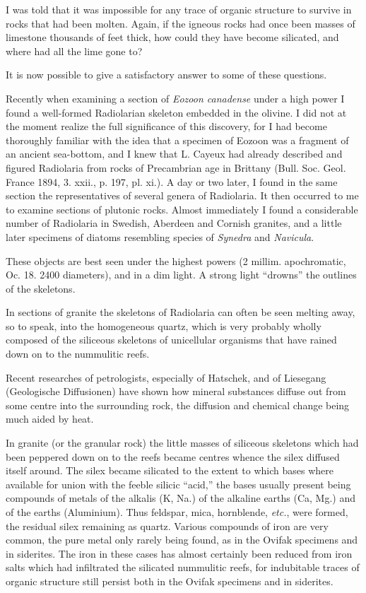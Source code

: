 \documentclass[a4paper, 12pt, oneside]{article}
\begin{document}
I was told that it was impossible for any trace of organic structure to survive in rocks that had been molten. Again, if the igneous rocks had once been masses of limestone thousands of feet thick, how could they have become silicated, and where had all the lime gone to?

It is now possible to give a satisfactory answer to some of these questions.

Recently when examining a section of \emph{Eozoon canadense} under a high power I found a well-formed Radiolarian skeleton embedded in the olivine. I did not at the moment realize the full significance of this discovery, for I had become thoroughly familiar with the idea that a specimen of Eozoon was a fragment of an ancient sea-bottom, and I knew that L. Cayeux had already described and figured Radiolaria from rocks of Precambrian age in Brittany (Bull. Soc. Geol. France 1894, 3. xxii., p. 197, pl. xi.). A day or two later, I found in the same section the representatives of several genera of Radiolaria. It then occurred to me to examine sections of plutonic rocks. Almost immediately I found a considerable number of Radiolaria in Swedish, Aberdeen and Cornish granites, and a little later specimens of diatoms resembling species of \emph{Synedra} and \emph{Navicula}.

These objects are best seen under the highest powers (2 millim. apochromatic, Oc. 18. 2400 diameters), and in a dim light. A strong light ``drowns'' the outlines of the skeletons.

In sections of granite the skeletons of Radiolaria can often be seen melting away, so to speak, into the homogeneous quartz, which is very probably wholly composed of the siliceous skeletons of unicellular organisms that have rained down on to the nummulitic reefs.

Recent researches of petrologists, especially of Hatschek, and of Liesegang (Geologische Diffusionen) have shown how mineral substances diffuse out from some centre into the surrounding rock, the diffusion and chemical change being much aided by heat.

In granite (or the granular rock) the little masses of siliceous skeletons which had been peppered down on to the reefs became centres whence the silex diffused itself around. The silex became silicated to the extent to which bases where available for union with the feeble silicic ``acid,'' the bases usually present being compounds of metals of the alkalis (K, Na.) of the alkaline earths (Ca, Mg.) and of the earths (Aluminium). Thus feldspar, mica, hornblende, \emph{etc.}, were formed, the residual silex remaining as quartz. Various compounds of iron are very common, the pure metal only rarely being found, as in the Ovifak specimens and in siderites. The iron in these cases has almost certainly been reduced from iron salts which had infiltrated the silicated nummulitic reefs, for indubitable traces of organic structure still persist both in the Ovifak specimens and in siderites.
\end{document}
